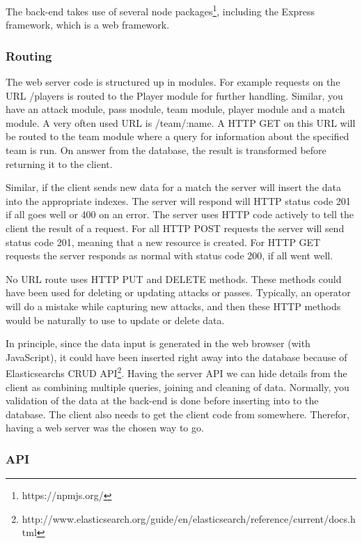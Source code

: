 The back-end takes use of several node packages\footnote{https://npmjs.org/}, including the Express framework, which is a web framework. 

\subsubsection{Routing}

The web server code is structured up in modules. For example requests on the URL /players is routed to the Player module for further handling. Similar, you have an attack module, pass module, team module, player module and a match module. A very often used URL is /team/:name. A \ac{HTTP} GET on this URL will be routed to the team module where a query for information about the specified team is run. On answer from the database, the result is transformed before returning it to the client. 

Similar, if the client sends new data for a match the server will insert the data into the appropriate indexes. The server will respond will HTTP status code 201 if all goes well or 400 on an error. The server uses \ac{HTTP} code actively to tell the client the result of a request. For all \ac{HTTP} POST requests the server will send status code 201, meaning that a new resource is created. For \ac{HTTP} GET requests the server responds as normal with status code 200, if all went well. 

No URL route uses \ac{HTTP} PUT and DELETE methods. These methods could have been used for deleting or updating attacks or passes. Typically, an operator will do a mistake while capturing new attacks, and then these HTTP methods would be naturally to use to update or delete data.

In principle, since the data input is generated in the web browser (with JavaScript), it could have been inserted right away into the database because of Elasticsearchs \ac{CRUD} API\footnote{http://www.elasticsearch.org/guide/en/elasticsearch/reference/current/docs.html}.  Having the server API we can hide details from the client as combining multiple queries, joining and cleaning of data. Normally, you validation of the data at the back-end is done before inserting into to the database. The client also needs to get the client code from somewhere. Therefor, having a web server was the chosen way to go.

\subsubsection{API}

